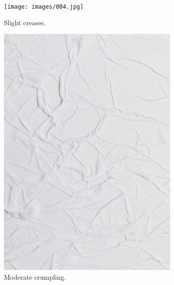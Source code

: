 \begin{figure}
    \centering
    \begin{subfigure}{0.3\textwidth}
        \texttt{[image: images/004.jpg]}
        \caption{Slight creases.}
    \end{subfigure}
    \begin{subfigure}{0.3\textwidth}
        \includegraphics[width=\textwidth]{images/009.jpg}
        \caption{Moderate crumpling.}
    \end{subfigure}
    \begin{subfigure}{0.3\textwidth}

\end{subfigure}
\end{figure}
